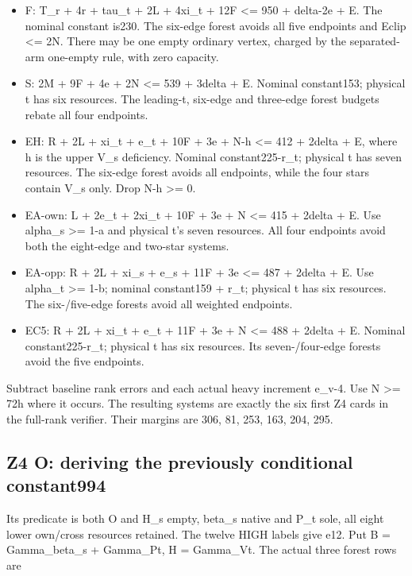 \documentclass[11pt,a4paper]{article}
\newcommand{\tightlist}{\setlength{\itemsep}{0pt}\setlength{\parskip}{0pt}}
\begin{document}
\begin{itemize}
\tightlist
\item
  F: T\_r + 4r + tau\_t + 2L + 4xi\_t + 12F \textless= 950 + delta-2e +
  E. The nominal constant is230. The six-edge forest avoids all five
  endpoints and Eclip \textless= 2N. There may be one empty ordinary
  vertex, charged by the separated-arm one-empty rule, with zero
  capacity.
\item
  S: 2M + 9F + 4e + 2N \textless= 539 + 3delta + E. Nominal constant153;
  physical t has six resources. The leading-t, six-edge and three-edge
  forest budgets rebate all four endpoints.
\item
  EH: R + 2L + xi\_t + e\_t + 10F + 3e + N-h \textless= 412 + 2delta +
  E, where h is the upper V\_s deficiency. Nominal constant225-r\_t;
  physical t has seven resources. The six-edge forest avoids all
  endpoints, while the four stars contain V\_s only. Drop N-h
  \textgreater= 0.
\item
  EA-own: L + 2e\_t + 2xi\_t + 10F + 3e + N \textless= 415 + 2delta + E.
  Use alpha\_s \textgreater= 1-a and physical t's seven resources. All
  four endpoints avoid both the eight-edge and two-star systems.
\item
  EA-opp: R + 2L + xi\_s + e\_s + 11F + 3e \textless= 487 + 2delta + E.
  Use alpha\_t \textgreater= 1-b; nominal constant159 + r\_t; physical t
  has six resources. The six-/five-edge forests avoid all weighted
  endpoints.
\item
  EC5: R + 2L + xi\_t + e\_t + 11F + 3e + N \textless= 488 + 2delta + E.
  Nominal constant225-r\_t; physical t has six resources. Its
  seven-/four-edge forests avoid the five endpoints.
\end{itemize}

Subtract baseline rank errors and each actual heavy increment e\_v-4.
Use N \textgreater= 72h where it occurs. The resulting systems are
exactly the six first Z4 cards in the full-rank verifier. Their margins
are 306, 81, 253, 163, 204, 295.

\hypertarget{z4-o-deriving-the-previously-conditional-constant994}{%
\subsection{Z4 O: deriving the previously conditional
constant994}\label{z4-o-deriving-the-previously-conditional-constant994}}

Its predicate is both O and H\_s empty, beta\_s native and P\_t sole,
all eight lower own/cross resources retained. The twelve HIGH labels
give e12. Put B = Gamma\_beta\_s + Gamma\_Pt, H = Gamma\_Vt. The actual
three forest rows are
\end{document}
